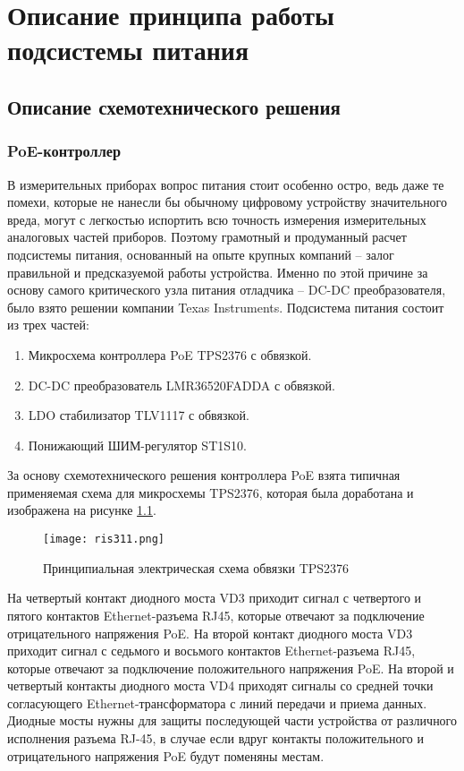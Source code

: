 \chapter{Описание принципа работы подсистемы питания}
\section{Описание схемотехнического решения}
\subsection{PoE-контроллер}
\hspace{1cm} 

В измерительных приборах вопрос питания стоит особенно остро, ведь даже те помехи, которые 
не нанесли бы обычному цифровому устройству значительного вреда, могут с легкостью испортить
всю точность измерения измерительных аналоговых частей приборов. Поэтому грамотный и продуманный расчет 
подсистемы питания, основанный на опыте крупных компаний -- залог правильной и предсказуемой работы устройства.
Именно по этой причине за основу самого критического узла питания отладчика -- DC-DC преобразователя,
было взято решении компании Texas Instruments.
Подсистема питания состоит из трех частей:

\begin{enumerate}
    \item Микросхема контроллера PoE TPS2376 с обвязкой.
    \item DC-DC преобразователь LMR36520FADDA с обвязкой.
    \item LDO стабилизатор TLV1117 с обвязкой.
    \item Понижающий ШИМ-регулятор  ST1S10.
\end{enumerate}

За основу схемотехнического решения контроллера PoE взята типичная применяемая схема для
микросхемы TPS2376, которая была доработана и изображена на рисунке \ref{ris:311}.

\begin{figure}[H]
    \centering
    \texttt{[image: ris311.png]}
    \caption{Принципиальная электрическая схема обвязки TPS2376 }
    \label{ris:311}
\end{figure}

На четвертый контакт диодного моста VD3 приходит сигнал с четвертого и пятого контактов 
Ethernet-разъема RJ45, которые отвечают за подключение отрицательного напряжения PoE.
На второй контакт диодного моста VD3 приходит сигнал с седьмого и восьмого контактов 
Ethernet-разъема RJ45, которые отвечают за подключение положительного напряжения PoE.  
На второй и четвертый контакты диодного моста VD4 приходят сигналы со средней точки согласующего
Ethernet-трансформатора с линий передачи и приема данных. Диодные мосты нужны для защиты последующей 
части устройства от различного исполнения разъема RJ-45, в случае если вдруг контакты положительного 
и отрицательного напряжения PoE будут поменяны местам.


